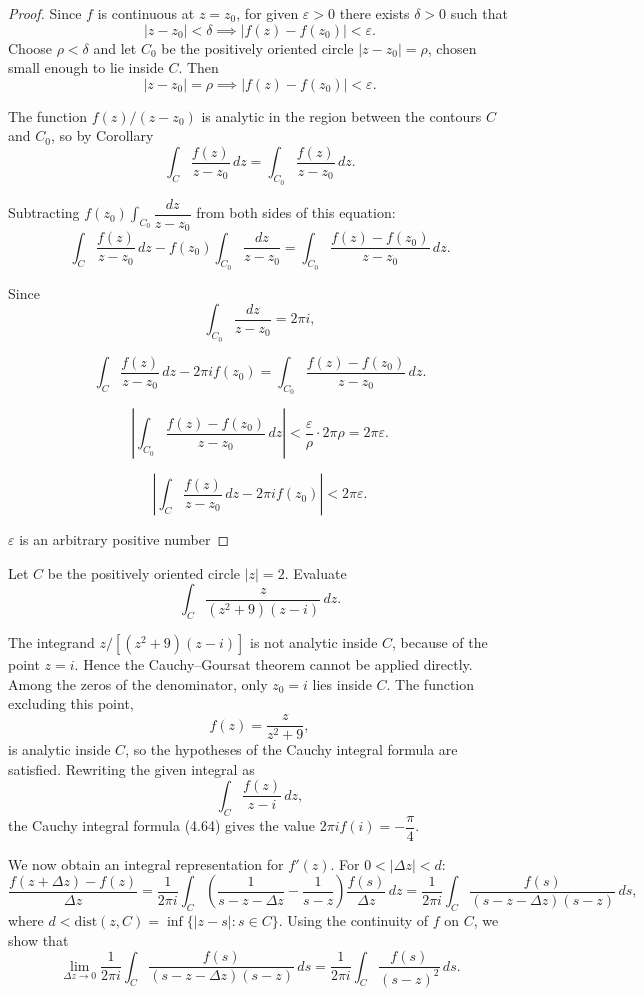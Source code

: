 \documentclass{article}
\begin{document}
\begin{proof}
Since $f$ is continuous at $z=z_0$, for given $\varepsilon>0$ there exists $\delta>0$ such that
\[
|z-z_0|<\delta \implies |f(z)-f(z_0)|<\varepsilon.
\]
Choose $\rho<\delta$ and let $C_0$ be the positively oriented circle $|z-z_0|=\rho$, chosen small enough to lie inside $C$. Then
\[
|z-z_0|=\rho \implies |f(z)-f(z_0)|<\varepsilon.
\]

The function $f(z)/(z-z_0)$ is analytic in the region between the contours $C$ and $C_0$, so by Corollary 
\[
\int_C \frac{f(z)}{z-z_0}\,dz = \int_{C_0} \frac{f(z)}{z-z_0}\,dz.
\]

Subtracting $f(z_0)\int_{C_0} \dfrac{dz}{z-z_0}$ from both sides of this equation:
\[
\int_C \frac{f(z)}{z-z_0}\,dz - f(z_0)\int_{C_0}\frac{dz}{z-z_0} = \int_{C_0}\frac{f(z)-f(z_0)}{z-z_0}\,dz. 
\]

Since
\[
\int_{C_0}\frac{dz}{z-z_0} = 2\pi i,
\]

\[
\int_C \frac{f(z)}{z-z_0}\,dz - 2\pi i f(z_0) = \int_{C_0}\frac{f(z)-f(z_0)}{z-z_0}\,dz.
\]

\[
\left|\int_{C_0}\frac{f(z)-f(z_0)}{z-z_0}\,dz\right| < \frac{\varepsilon}{\rho}\cdot 2\pi\rho = 2\pi\varepsilon.
\]

\[
\left|\int_C \frac{f(z)}{z-z_0}\,dz - 2\pi i f(z_0)\right| < 2\pi\varepsilon.
\]

 $\varepsilon$ is an arbitrary positive number
\end{proof}

\begin{example}
Let $C$ be the positively oriented circle $|z|=2$. Evaluate
\[
\int_C \frac{z}{(z^2+9)(z-i)}\,dz.
\]
\end{example}

\begin{solution}
The integrand $z/[(z^2+9)(z-i)]$ is not analytic inside $C$, because of the point $z=i$. Hence the Cauchy--Goursat theorem cannot be applied directly. Among the zeros of the denominator, only $z_0=i$ lies inside $C$. The function excluding this point,
\[
f(z) = \frac{z}{z^2+9},
\]
is analytic inside $C$, so the hypotheses of the Cauchy integral formula are satisfied. Rewriting the given integral as
\[
\int_C \frac{f(z)}{z-i}\,dz,
\]
the Cauchy integral formula (4.64) gives the value $2\pi i f(i) = -\dfrac{\pi}{4}$.
\end{solution}

\bigskip

We now obtain an integral representation for $f'(z)$. For $0<|\Delta z|<d$:
\[
\frac{f(z+\Delta z)-f(z)}{\Delta z} = \frac{1}{2\pi i}\int_C \left(\frac{1}{s-z-\Delta z} - \frac{1}{s-z}\right)\frac{f(s)}{\Delta z}\,dz
= \frac{1}{2\pi i}\int_C \frac{f(s)}{(s-z-\Delta z)(s-z)}\,ds,
\]
where $d < \mathrm{dist}(z,C) = \inf\{|z-s| : s\in C\}$. Using the continuity of $f$ on $C$, we show that
\[
\lim_{\Delta z\to 0} \frac{1}{2\pi i}\int_C \frac{f(s)}{(s-z-\Delta z)(s-z)}\,ds = \frac{1}{2\pi i}\int_C \frac{f(s)}{(s-z)^2}\,ds.
\]
\end{document}
